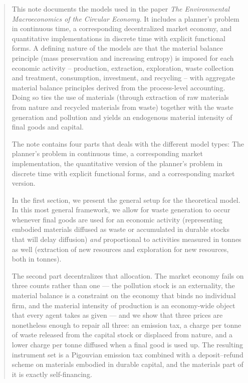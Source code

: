﻿\begin{abstract}
\noindent
This note documents the models used in the paper  \emph{The Environmental Macroeconomics of the Circular Economy}. It includes a planner's problem in continuous time, a corresponding decentralized market economy, and quantitative implementations in discrete time with explicit functional forms. A defining nature of the models are that the material balance principle (mass preservation and increasing entropy) is imposed for each economic activity -- production, extraction, exploration, waste collection and treatment, consumption, investment, and recycling -- with aggregate material balance principles derived from the process-level accounting. Doing so ties the use of materials (through extraction of raw materials from nature and recycled materials from waste) together with the waste generation and pollution and yields an endogenous material intensity of final goods and capital. 


The note contains four parts that deals with the different model types: The planner's problem in continuous time, a corresponding market implementation, the quantitative version of the planner's problem in discrete time with explicit functional forms, and a corresponding market version. 


In the first section, we present the general setup for the theoretical model. In this most general framework, we allow for waste generation to occur whenever final goods are used for an economic activity (representing embodied materials diffused as waste or accumulated in durable stocks that will delay diffusion) \emph{and} proportional to activities measured in tonnes as well (extraction of new resources and exploration for new resources, both in tonnes).

The second part decentralizes that allocation. The market economy fails on three counts rather than one --- the pollution stock is an externality, the material balance is a constraint on the economy that binds no individual firm, and the material intensity of production is an economy-wide object that every agent takes as given --- and we show that three prices are nonetheless enough to repair all three: an emission tax, a charge per tonne of waste released from the capital stock or displaced from nature, and a lower charge per tonne diffused when a final good is used up. The resulting instrument set is a Pigouvian emission tax combined with a deposit--refund scheme on materials embodied in durable capital, and the materials part of it is exactly self-financing.


\end{abstract}
